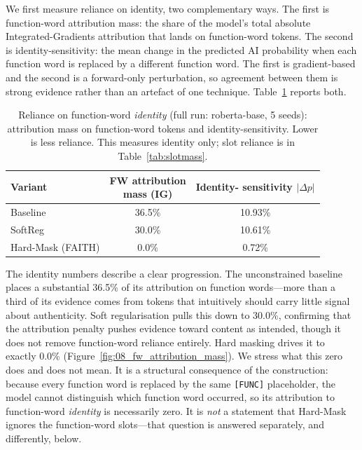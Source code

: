 \documentclass[10pt,twocolumn]{article}
\begin{document}
We first measure reliance on identity, two complementary ways. The first is function-word attribution mass: the share of the model's total absolute Integrated-Gradients attribution that lands on function-word tokens. The second is identity-sensitivity: the mean change in the predicted AI probability when each function word is replaced by a different function word. The first is gradient-based and the second is a forward-only perturbation, so agreement between them is strong evidence rather than an artefact of one technique. Table~\ref{tab:reliance} reports both.

\begin{table}[tb]\centering
\caption{Reliance on function-word \emph{identity} (full run: roberta-base, 5 seeds): attribution mass on function-word tokens and identity-sensitivity. Lower is less reliance. This measures identity only; slot reliance is in Table~\ref{tab:slotmass}.}
\label{tab:reliance}
\footnotesize
\begin{tabular}{lcc}
\toprule
Variant & \shortstack{FW attribution\\mass (IG)} & \shortstack{Identity-\\sensitivity $|\Delta p|$} \\
\midrule
Baseline & 36.5\% & 10.93\% \\
SoftReg & 30.0\% & 10.61\% \\
Hard-Mask (FAITH) & 0.0\% & 0.72\% \\
\bottomrule
\end{tabular}
\end{table}

The identity numbers describe a clear progression. The unconstrained baseline places a substantial 36.5\% of its attribution on function words---more than a third of its evidence comes from tokens that intuitively should carry little signal about authenticity. Soft regularisation pulls this down to 30.0\%, confirming that the attribution penalty pushes evidence toward content as intended, though it does not remove function-word reliance entirely. Hard masking drives it to exactly 0.0\% (Figure~\ref{fig:08_fw_attribution_mass}). We stress what this zero does and does not mean. It is a structural consequence of the construction: because every function word is replaced by the same \texttt{[FUNC]} placeholder, the model cannot distinguish which function word occurred, so its attribution to function-word \emph{identity} is necessarily zero. It is \emph{not} a statement that Hard-Mask ignores the function-word slots---that question is answered separately, and differently, below.
\end{document}

